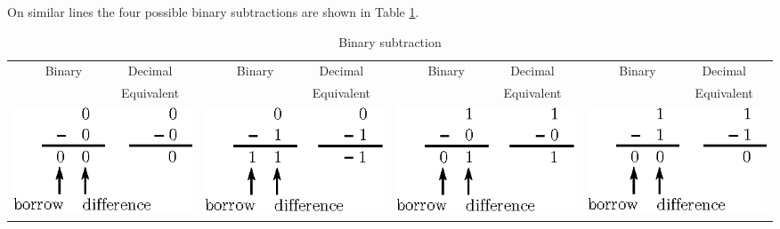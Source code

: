 On similar lines the four possible binary subtractions are shown in Table \ref{tab6.4}.
\begin{table}[H]
\centering
\caption{Binary subtraction}\label{tab6.4}
\tabcolsep=1pt
\begin{tabular}{|c@{\qquad}c|c@{\qquad}c|c@{\qquad}c|c@{\qquad}c|}
\hline
{~~~\small Binary} & {\small Decimal} & {~~~\small Binary} & {\small Decimal} & {~~~\small Binary} & {\small Decimal} & {~~~\small Binary} & {\small Decimal}\\[-2pt]
       & {\small Equivalent} & & {\small Equivalent} & & {\small Equivalent} && {\small Equivalent}\\
\hline
\multicolumn{2}{|c|}{\includegraphics[scale=.9]{chap6/fig45.eps}} &
\multicolumn{2}{c|}{\includegraphics[scale=.9]{chap6/fig46.eps}} &
\multicolumn{2}{c|}{\includegraphics[scale=.9]{chap6/fig47.eps}} &
\multicolumn{2}{c|}{\includegraphics[scale=.9]{chap6/fig48.eps}}\\
\hline 
\end{tabular}
\end{table}

